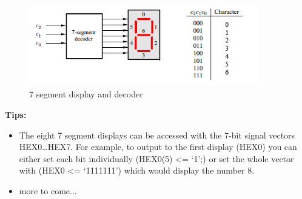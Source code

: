 \begin{figure}[H]
	\centering
	\includegraphics[width=100mm]{Lab1/figures/7seg.png}
	\caption{7 segment display and decoder}
	\label{fig:7seg}
\end{figure}

{\bf Tips:} 
\begin{itemize}
  \item The eight 7 segment displays can be accessed with the 7-bit signal vectors HEX0\ldots HEX7. For example, to output to the first display (HEX0) you can either set each bit individually (HEX0(5) <= `1';) or set the whole vector with (HEX0 <= `1111111') which would display the number 8. 
\item more to come...
\end{itemize}